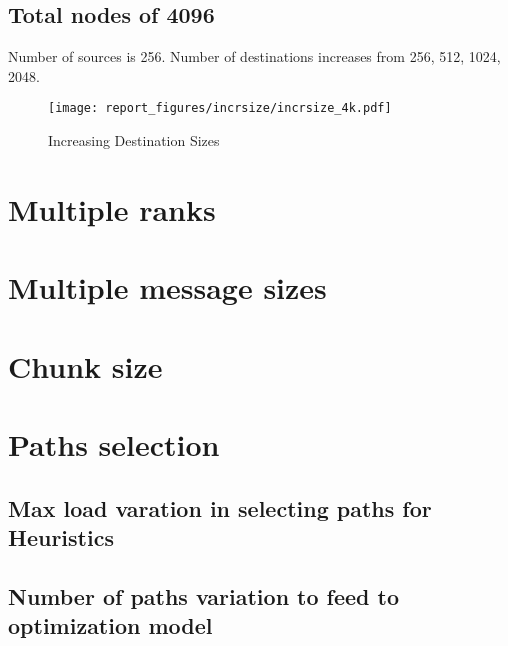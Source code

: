 \documentclass[letter]{article}
\begin{document}


\clearpage
\newpage

\subsection{Total nodes of 4096}

Number of sources is 256. Number of destinations increases from 256, 512, 1024, 2048.

\begin{figure}[h]
\vspace{-0.1in}
\centering
\texttt{[image: report\_figures/incrsize/incrsize\_4k.pdf]}
\vspace{-0.1in}
\caption{Increasing Destination Sizes}
\vspace{-0.1in}
\label{fig:incrsize_4k}
\end{figure}

\clearpage
\newpage





\clearpage
\newpage

\section{Multiple ranks}

\section{Multiple message sizes}

\section{Chunk size}

\section{Paths selection}

\subsection{Max load varation in selecting paths for Heuristics}

\subsection{Number of paths variation to feed to optimization model}
\end{document}
